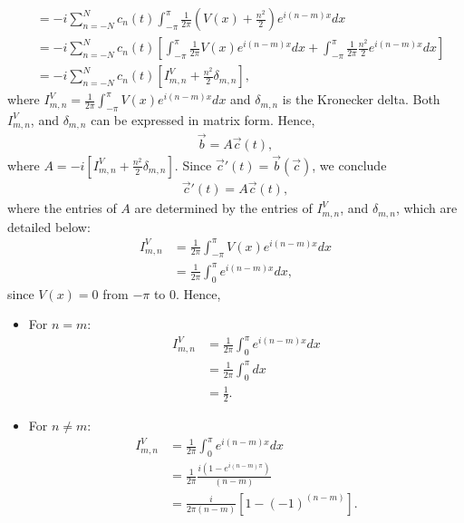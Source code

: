 \begin{questions}
\begin{solution}
\begin{align*}
&= -i\sum_{n=-N}^Nc_n(t)\int_{-\pi}^{\pi}\frac{1}{2\pi} \left(V (x) + \frac{n^2}{2}\right)e^{i(n-m)x} dx\\
&= -i\sum_{n=-N}^Nc_n(t)\left[\int_{-\pi}^{\pi}\frac{1}{2\pi} V (x) e^{i(n-m)x} dx + \int_{-\pi}^{\pi}\frac{1}{2\pi}\frac{n^2}{2}e^{i(n-m)x} dx \right] \\
&= -i\sum_{n=-N}^Nc_n(t)\left[I^V_{m,n} + \frac{n^2}{2}\delta_{m,n} \right],
\end{align*}
where $I^V_{m,n} = \frac{1}{2\pi}\int_{-\pi}^{\pi} V (x) e^{i(n-m)x} dx$ and $\delta_{m,n}$ is the Kronecker delta. Both $I^V_{m,n}$, and $\delta_{m,n}$ can be expressed in matrix form. Hence,
\begin{align*}
\overrightarrow{b} = A\overrightarrow{c}(t),
\end{align*}
where $A = -i\left[I^V_{m,n} + \frac{n^2}{2}\delta_{m,n} \right]$. Since $\overrightarrow{c}' (t) =\overrightarrow{b} (\overrightarrow{c})$, we conclude
\begin{align*}
\overrightarrow{c}' (t) = A\overrightarrow{c}(t),
\end{align*}
where the entries of $A$ are determined by the entries of $I^V_{m,n}$, and $\delta_{m,n}$, which are detailed below:
\begin{align*}
I^V_{m,n} &= \frac{1}{2\pi}\int_{-\pi}^{\pi} V (x) e^{i(n-m)x} dx\\
&= \frac{1}{2\pi}\int_{0}^{\pi} e^{i(n-m)x} dx,
\end{align*}
since $V(x) = 0$ from $-\pi$ to $0$. Hence,
\begin{itemize}
\item For $n=m$:
\begin{align*}
I^V_{m,n} &= \frac{1}{2\pi}\int_{0}^{\pi} e^{i(n-m)x} dx\\
&= \frac{1}{2\pi}\int_{0}^{\pi} dx\\
&= \frac{1}{2}.
\end{align*}
\item For $n \neq m$:
\begin{align*}
I^V_{m,n} &= \frac{1}{2\pi}\int_{0}^{\pi} e^{i(n-m)x} dx\\
&= \frac{1}{2\pi}\frac{i\left(1-e^{i(n-m)\pi}\right)}{(n-m)}\\
&= \frac{i}{2\pi(n-m)}\left[ 1-(-1)^{(n-m)}\right].
\end{align*}
\end{itemize}


\end{solution}
\end{questions}
